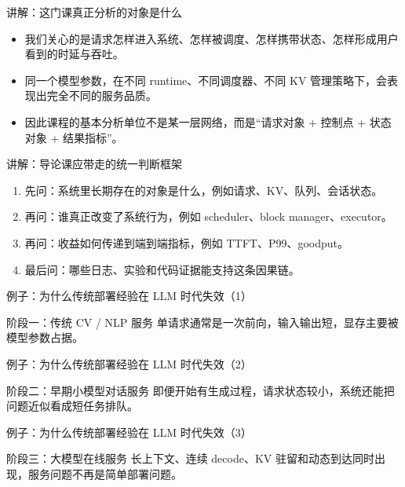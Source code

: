 \begin{frame}{讲解：这门课真正分析的对象是什么}
  \begin{itemize}
    \item 我们关心的是请求怎样进入系统、怎样被调度、怎样携带状态、怎样形成用户看到的时延与吞吐。
    \item 同一个模型参数，在不同 runtime、不同调度器、不同 KV 管理策略下，会表现出完全不同的服务品质。
    \item 因此课程的基本分析单位不是某一层网络，而是“请求对象 + 控制点 + 状态对象 + 结果指标”。
  \end{itemize}
\end{frame}

\begin{frame}{讲解：导论课应带走的统一判断框架}
  \begin{enumerate}
    \item 先问：系统里长期存在的对象是什么，例如请求、KV、队列、会话状态。
    \item 再问：谁真正改变了系统行为，例如 scheduler、block manager、executor。
    \item 再问：收益如何传递到端到端指标，例如 TTFT、P99、goodput。
    \item 最后问：哪些日志、实验和代码证据能支持这条因果链。
  \end{enumerate}
\end{frame}

\begin{frame}{例子：为什么传统部署经验在 LLM 时代失效（1）}
  \begin{block}{阶段一：传统 CV / NLP 服务}
    单请求通常是一次前向，输入输出短，显存主要被模型参数占据。
  \end{block}
\end{frame}

\begin{frame}{例子：为什么传统部署经验在 LLM 时代失效（2）}
  \begin{block}{阶段二：早期小模型对话服务}
    即便开始有生成过程，请求状态较小，系统还能把问题近似看成短任务排队。
  \end{block}
\end{frame}

\begin{frame}{例子：为什么传统部署经验在 LLM 时代失效（3）}
  \begin{block}{阶段三：大模型在线服务}
    长上下文、连续 decode、KV 驻留和动态到达同时出现，服务问题不再是简单部署问题。
  \end{block}
\end{frame}

